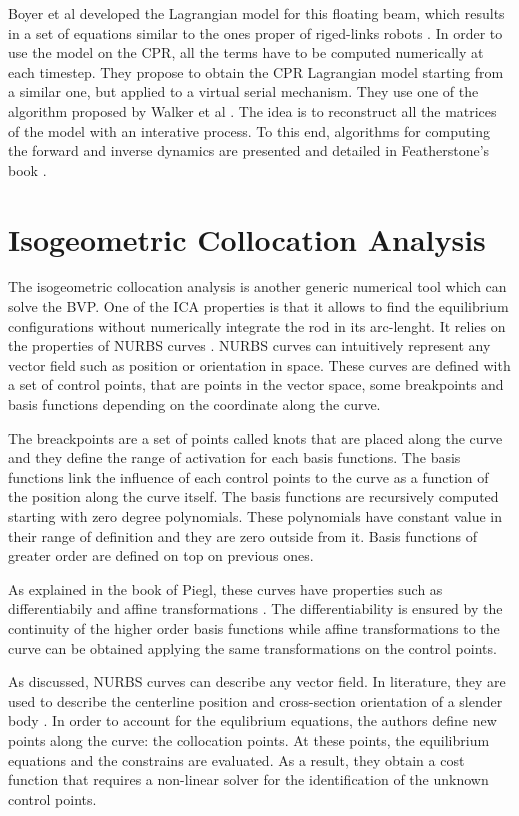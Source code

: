 \documentclass{thesisreport}
\begin{document}
 Boyer et al developed the Lagrangian model for this floating beam, which results in a set of equations similar to the ones proper of riged-links robots \cite{boyer_dynamics_2019}. In order to use the model on the CPR, all the terms have to be computed numerically at each timestep. They propose to obtain the CPR Lagrangian model starting from a similar one, but applied to a virtual serial mechanism. They use one of the algorithm proposed by Walker et al \cite{walker_efficient_1982}. The idea is to reconstruct all the matrices of the model with an interative process. To this end, algorithms for computing the forward and inverse dynamics are presented and detailed in Featherstone's book \cite{featherstone_rigid_2008}.

 
 \section{Isogeometric Collocation Analysis}
 The isogeometric collocation analysis is another generic numerical tool which can solve the BVP. One of the ICA properties is that it allows to find the equilibrium configurations without numerically integrate the rod in its arc-lenght. 
 It relies on the properties of NURBS curves \cite{piegl_nurbs_1997}. NURBS curves can intuitively represent any vector field such as position or orientation in space. These curves are defined with a set of control points, that are points in the vector space, some breakpoints and basis functions depending on the coordinate along the curve.
 
  The breackpoints are a set of points called knots that are placed along the curve and they define the range of activation for each basis functions. The basis functions link the influence of each control points to the curve as a function of the position along the curve itself. The basis functions are recursively computed starting with zero degree polynomials. These polynomials have constant value in their range of definition and they are zero outside from it. Basis functions of greater order are defined on top on previous ones. 
  
 As explained in the book of Piegl, these curves have properties such as differentiabily and affine transformations \cite{piegl_nurbs_1997}. The differentiability is ensured by the continuity of the higher order basis functions while affine transformations to the curve can be obtained applying the same transformations on the control points.
 
 As discussed, NURBS curves can describe any vector field. In literature, they are used to describe the centerline position and cross-section orientation of a slender body \cite{weeger_isogeometric_2017-1}. In order to account for the equlibrium equations, the authors define new points along the curve: the collocation points. At these points, the equilibrium equations and the constrains are evaluated. As a result, they obtain a cost function that requires a non-linear solver for the identification of the unknown control points.
 
\end{document}
